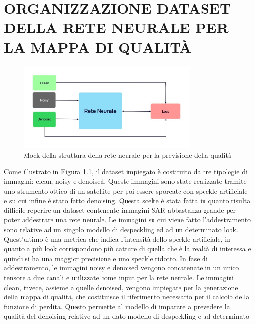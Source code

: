 
\chapter{ORGANIZZAZIONE DATASET DELLA RETE NEURALE PER LA MAPPA DI QUALITÀ}

\begin{figure}[h] %
    \centering
    \includegraphics[width=0.8\textwidth]{utils/Architettura_rete_neurale.jpg}
    \caption{Mock della struttura della rete neurale per la previsione della qualità}
    \label{fig:MockReteNeurale}
\end{figure}

Come illustrato in Figura \ref{fig:MockReteNeurale}, il dataset impiegato è costituito da tre tipologie di 
immagini: clean, noisy e denoised. Queste immagini sono state realizzate tramite uno strumento ottico di un
satellite per poi essere sporcate con speckle artificiale e su cui infine è stato fatto denoising. Questa scelte è stata fatta
in quanto risulta difficile reperire un dataset contenente immagini SAR abbastanza grande per poter 
addestrare una rete neurale. Le immagini su cui viene fatto l'addestramento sono relative ad un singolo modello di despeckling ed ad 
un determinato look. Quest'ultimo è una metrica che indica l'intensità dello speckle artificiale, in quanto a più look 
corrispondono più catture di quella che è la realtà di interessa e quindi si ha una maggior precisione e uno speckle ridotto.
In fase di addestramento, le immagini noisy e denoised vengono concatenate in un unico tensore a due canali e utilizzate come 
input per la rete neurale. Le immagini clean, invece, assieme a quelle denoised, vengono impiegate per la 
generazione della mappa di qualità, che costituisce il riferimento necessario per 
il calcolo della funzione di perdita. Questo permette al modello di imparare a 
prevedere la qualità del denoising relative ad un dato modello di despeckling e ad determinato   